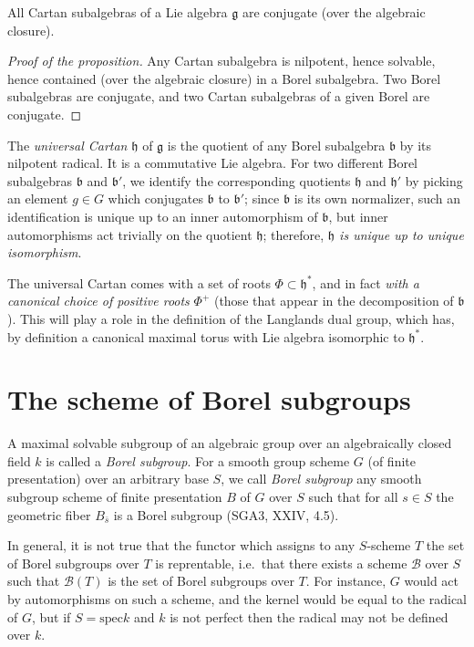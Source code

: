 \begin{proposition}
 All Cartan subalgebras of a Lie algebra $\mathfrak g$ are conjugate  (over the algebraic closure).
\end{proposition}

\begin{proof}[Proof of the proposition]
 Any Cartan subalgebra is nilpotent, hence solvable, hence contained (over the algebraic closure) in a Borel subalgebra. Two Borel subalgebras are conjugate, and two Cartan subalgebras of a given Borel are conjugate.
\end{proof}

\begin{definition}
 The \emph{universal Cartan} $\mathfrak h$ of $\mathfrak g$ is the quotient of any Borel subalgebra $\mathfrak b$ by its nilpotent radical. It is a commutative Lie algebra. For two different Borel subalgebras $\mathfrak b$ and $\mathfrak b'$, we identify the corresponding quotients $\mathfrak h$ and $\mathfrak h'$ by picking an element $g\in G$ which conjugates $\mathfrak b$ to $\mathfrak b'$; since $\mathfrak b$ is its own normalizer, such an identification is unique up to an inner automorphism of $\mathfrak b$, but inner automorphisms act trivially on the quotient $\mathfrak h$; therefore, \emph{$\mathfrak h$ is unique up to unique isomorphism}.
\end{definition}

The universal Cartan comes with a set of roots $\Phi\subset \mathfrak h^*$, and in fact \emph{with a canonical choice of positive roots} $\Phi^+$ (those that appear in the decomposition of $\mathfrak b$). This will play a role in the definition of the Langlands dual group, which has, by definition a canonical maximal torus with Lie algebra isomorphic to $\mathfrak h^*$.

\section{The scheme of Borel subgroups}

A maximal solvable subgroup of an algebraic group over an algebraically closed field $k$ is called a \emph{Borel subgroup}. For a smooth group scheme $G$ (of finite presentation) over an arbitrary base $S$, we call \emph{Borel subgroup} any smooth subgroup scheme of finite presentation $B$ of $G$ over $S$ such that for all $s\in S$ the geometric fiber $B_{\bar s}$ is a Borel subgroup (SGA3, XXIV, 4.5). 

In general, it is not true that the functor which assigns to any $S$-scheme $T$ the set of Borel subgroups over $T$ is reprentable, i.e.\ that there exists a scheme $\mathcal B$ over $S$ such that $\mathcal B(T)$ is the set of Borel subgroups over $T$. For instance, $G$ would act by automorphisms on such a scheme, and the kernel would be equal to the radical of $G$, but if $S=\text{spec} k$ and $k$ is not perfect then the radical may not be defined over $k$.

